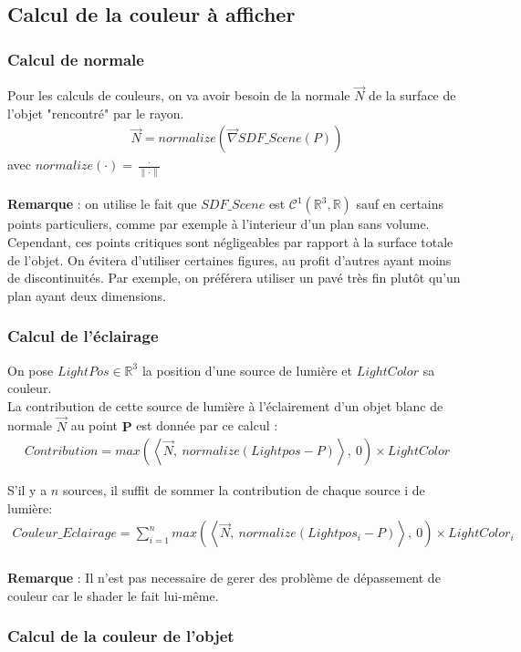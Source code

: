 \newpage
\subsection{Calcul de la couleur à afficher}
\subsubsection{Calcul de normale}
Pour les calculs de couleurs, on va avoir besoin de la normale $\Vec{N}$ de la surface de l'objet "rencontré" par le rayon.
\begin{align*}
    \Vec{N}=normalize(\Vec{\nabla}SDF\_Scene(P))
\end{align*}
avec $normalize(\cdot )=\frac{\cdot }{\|\cdot \|}$\\
\\
\textbf{Remarque} : on utilise le fait que $SDF\_Scene$ est $\mathcal{C}^1(\mathbb{R}^3,\mathbb{R})$ sauf en certains points particuliers, comme par exemple à l'interieur d'un plan sans volume. Cependant, ces points critiques sont négligeables par rapport à la surface totale de l'objet. On évitera d'utiliser certaines figures, au profit d'autres ayant moins de discontinuités. Par exemple, on préférera utiliser un pavé très fin plutôt qu'un plan ayant deux dimensions.
\subsubsection{Calcul de l'éclairage}
On pose $LightPos \in \mathbb{R}^3$ la position d'une source de lumière et $LightColor$ sa couleur.
\\La contribution de cette source de lumière à l'éclairement d'un objet blanc de normale $\Vec{N}$ au point $\mathbf{P}$ est donnée par ce calcul : 
\begin{align*}
    Contribution=max(\left\langle \Vec{N},\ normalize(Lightpos-P) \right\rangle,\ 0) \times LightColor
\end{align*}

S'il y a $n$ sources, il suffit de sommer la contribution de chaque source i de lumière:
\begin{align*}
    Couleur\_Eclairage=\sum_{i=1}^{n} max(\left\langle \Vec{N},\ normalize(Lightpos_i-P) \right\rangle,\ 0) \times LightColor_i
\end{align*}
\\
\textbf{Remarque} : Il n'est pas necessaire de gerer des problème de dépassement de couleur car le shader le fait lui-même.

\newpage
\subsubsection{Calcul de la couleur de l'objet}

